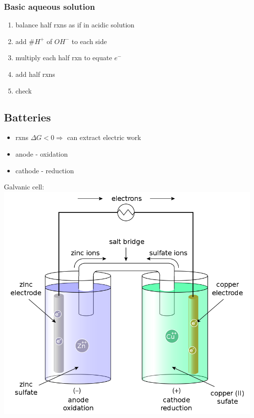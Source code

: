 \documentclass[ wastespaceontitle, english]{cheat_sheet_template}
\begin{document}
    \subsubsection{Basic aqueous solution}
    \begin{enumerate}
        \item balance half rxns as if in acidic solution
        \item add $\#H^+$ of $OH^-$ to each side 
        \item multiply each half rxn to equate $e^-$
        \item add half rxns
        \item check
    \end{enumerate}
    \subsection{Batteries}
    \begin{minipage}{0.35\linewidth}
          \begin{itemize}
        \item rxns $\Delta G < 0 \Rightarrow$ can extract electric work
        \item anode - oxidation
        \item cathode - reduction
    \end{itemize}
    
    \end{minipage}
     \begin{minipage}{0.55\linewidth}
     Galvanic cell:\\
     \includegraphics[width = \linewidth]{pictures/Galvanic_cell.png}
    \end{minipage}
\end{document}
